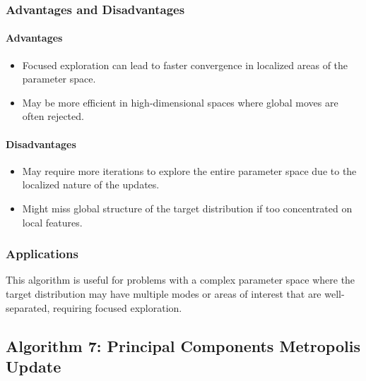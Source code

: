 \documentclass{article}
\begin{document}
\subsubsection{Advantages and Disadvantages}
\paragraph{Advantages}
\begin{itemize}
    \item Focused exploration can lead to faster convergence in localized areas of the parameter space.
    \item May be more efficient in high-dimensional spaces where global moves are often rejected.
\end{itemize}

\paragraph{Disadvantages}
\begin{itemize}
    \item May require more iterations to explore the entire parameter space due to the localized nature of the updates.
    \item Might miss global structure of the target distribution if too concentrated on local features.
\end{itemize}

\subsubsection{Applications}
This algorithm is useful for problems with a complex parameter space where the target distribution may have multiple modes or areas of interest that are well-separated, requiring focused exploration.

\subsection{Algorithm 7: Principal Components Metropolis Update}
\end{document}
